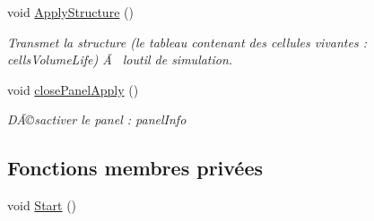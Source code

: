 \begin{DoxyCompactItemize}
void \mbox{\hyperlink{class_edit_mode_manager_ac1d4e4f292d17b4364054f05ddc13bee}{Apply\+Structure}} ()
\begin{DoxyCompactList}\small\item\em Transmet la structure (le tableau contenant des cellules vivantes \+: cells\+Volume\+Life) Ã  l\textquotesingle{}outil de simulation. \end{DoxyCompactList}\item 
void \mbox{\hyperlink{class_edit_mode_manager_ad6ef0af559103e1ec43cf0b393bef83c}{close\+Panel\+Apply}} ()
\begin{DoxyCompactList}\small\item\em DÃ©sactiver le panel \+: panel\+Info \end{DoxyCompactList}\end{DoxyCompactItemize}
\subsection*{Fonctions membres privées}
\begin{DoxyCompactItemize}
\item 
void \mbox{\hyperlink{class_edit_mode_manager_a4f5385630cfd8a65e1aac37f79b4f8d3}{Start}} ()
\end{DoxyCompactItemize}
